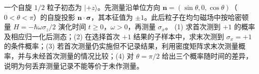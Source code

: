 一个自旋 \(1/2\) 粒子初态为 \(|+z\rangle\)。先测量沿单位方向 \(\boldsymbol n=(\sin\theta,0,\cos\theta)\)（\(0<\theta<\pi\)）的自旋投影 \(\boldsymbol n\cdot\boldsymbol\sigma\)，其本征值为 \(\pm1\)。此后粒子在均匀磁场中按哈密顿量 \(H=-\hbar\omega\sigma_z/2\) 演化时间 \(t\ge0\)，\(\omega>0\)，再测量 \(\sigma_x\)。
(1) 求首次测到 \(+1\) 的概率及相应归一化后测态；(2) 在选择首次 \(+1\) 结果的子样本中，求末次测到 \(\sigma_x=+1\) 的条件概率；(3) 若首次测量仍实施但不记录结果，利用密度矩阵求末次测量概率，并与未经首次测量的情况比较；(4) 对 \(\theta=\pi/2\) 给出三个概率随时间的差异，说明为何丢弃测量记录不能等价于未作测量。
